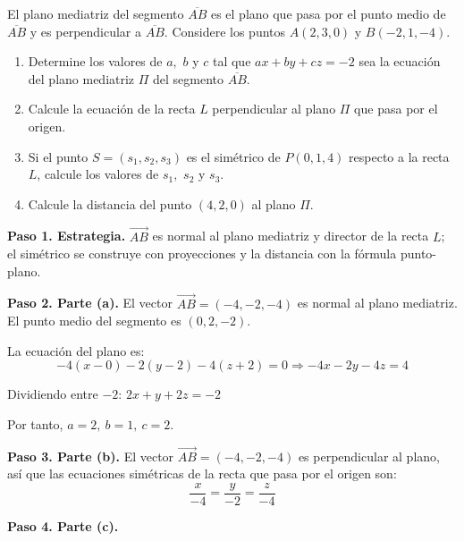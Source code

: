 
\begin{prob} El plano mediatriz del segmento $\overline{AB}$ es el plano que pasa por el punto medio de $\overline{AB}$ y es perpendicular a $\overline{AB}$. Considere los puntos $A(2,3,0)$ y $B(-2,1,-4)$.

 \begin{enumerate}[$a)$]
 \item Determine los valores de $a,$ $b$ y $c$ tal que $ax+by+cz=-2$ sea la ecuación del plano mediatriz $\Pi$ del segmento $\overline{AB}$.

\item Calcule la ecuación de la recta $L$ perpendicular al plano $\Pi$ que pasa por el origen.
 
\item Si el punto $S=(s_1,s_2,s_3)$ es el simétrico de $P(0,1,4)$ respecto a la recta $L$, calcule los valores de $s_1,$ $s_2$ y $s_3$.
  
\item Calcule la distancia del punto $(4,2,0)$ al plano $\Pi$.
 \end{enumerate}
 
\begin{myproof}
\textbf{Paso 1. Estrategia.} $\overrightarrow{AB}$ es normal al plano mediatriz y director de la recta $L$; el simétrico se construye con proyecciones y la distancia con la fórmula punto-plano.

\textbf{Paso 2. Parte (a).} El vector $\overrightarrow{AB}=(-4,-2,-4)$ es normal al plano mediatriz. El punto medio del segmento es $(0,2,-2)$.

La ecuación del plano es:
$$-4(x-0)-2(y-2)-4(z+2)=0 \Rightarrow -4x-2y-4z=4$$

Dividiendo entre $-2$: $2x+y+2z=-2$

Por tanto, $\boxed{a=2,\ b=1,\ c=2}$.

\textbf{Paso 3. Parte (b).} El vector $\overrightarrow{AB}=(-4,-2,-4)$ es perpendicular al plano, así que las ecuaciones simétricas de la recta que pasa por el origen son:
\begin{equation}
\frac{x}{-4}=\frac{y}{-2}=\frac{z}{-4}
\end{equation}

\textbf{Paso 4. Parte (c).}

\begin{figure}[H]
\centering
{}
\end{figure}
\end{myproof}
\end{prob}
